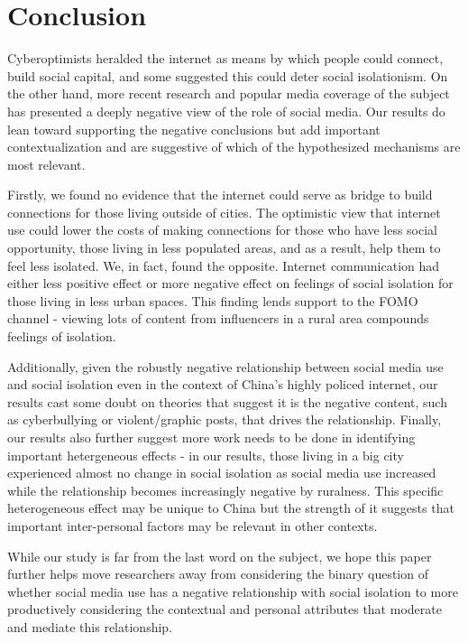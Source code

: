 \documentclass[]{interact}
\theoremstyle{plain}%
\theoremstyle{definition}
\theoremstyle{remark}
\begin{document}
\hypertarget{conclusion}{%
\section{Conclusion}\label{conclusion}}

Cyberoptimists heralded the internet as means by which people could
connect, build social capital, and some suggested this could deter
social isolationism. On the other hand, more recent research and popular
media coverage of the subject has presented a deeply negative view of
the role of social media. Our results do lean toward supporting the
negative conclusions but add important contextualization and are
suggestive of which of the hypothesized mechanisms are most relevant.

Firstly, we found no evidence that the internet could serve as bridge to
build connections for those living outside of cities. The optimistic
view that internet use could lower the costs of making connections for
those who have less social opportunity, those living in less populated
areas, and as a result, help them to feel less isolated. We, in fact,
found the opposite. Internet communication had either less positive
effect or more negative effect on feelings of social isolation for those
living in less urban spaces. This finding lends support to the FOMO
channel - viewing lots of content from influencers in a rural area
compounds feelings of isolation.

Additionally, given the robustly negative relationship between social
media use and social isolation even in the context of China's highly
policed internet, our results cast some doubt on theories that suggest
it is the negative content, such as cyberbullying or violent/graphic
posts, that drives the relationship. Finally, our results also further
suggest more work needs to be done in identifying important hetergeneous
effects - in our results, those living in a big city experienced almost
no change in social isolation as social media use increased while the
relationship becomes increasingly negative by ruralness. This specific
heterogeneous effect may be unique to China but the strength of it
suggests that important inter-personal factors may be relevant in other
contexts.

While our study is far from the last word on the subject, we hope this
paper further helps move researchers away from considering the binary
question of whether social media use has a negative relationship with
social isolation to more productively considering the contextual and
personal attributes that moderate and mediate this relationship.
\end{document}
